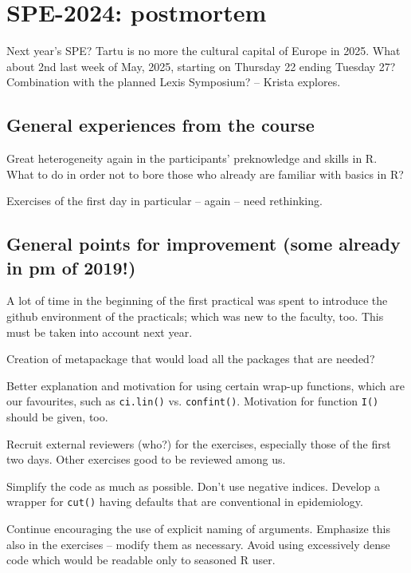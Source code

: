 \documentclass[11pt,a4]{article}
\begin{document}
\section*{SPE-2024: postmortem}

Next year's SPE? Tartu is no more the cultural capital of Europe in 2025.
What about 2nd last week of May, 2025, starting on Thursday 22 ending Tuesday 27? 
Combination with the planned Lexis Symposium? -- Krista explores.

\subsection*{General experiences from the course}

Great heterogeneity again in the participants' preknowledge and skills in R. 
What to do in order not to  bore those who already are familiar with basics in R?

Exercises of the first day in particular -- again -- need rethinking. 

\subsection*{General points for improvement (some already in pm of 2019!)}

A lot of time in the beginning of the first practical 
was spent to introduce the github environment of the practicals; which was new to the
faculty, too. This must be taken into account next year.

Creation of metapackage that would load all the packages that are needed? 

Better explanation and motivation for using certain wrap-up functions, which
are our favourites, such as \texttt{ci.lin()} vs. \texttt{confint()}.
Motivation for function \texttt{I()} should be given, too.

Recruit external reviewers (who?) for the exercises, especially those of the first two days.
Other exercises good to be reviewed among us.

Simplify the code as much as possible. Don't use negative indices. 
Develop a wrapper for {\tt cut()} having defaults that are conventional in epidemiology.


Continue encouraging the use of explicit naming of arguments. 
Emphasize this also in the exercises -- modify them as necessary.
Avoid using excessively dense code which would be readable only to seasoned R user.
\end{document}

